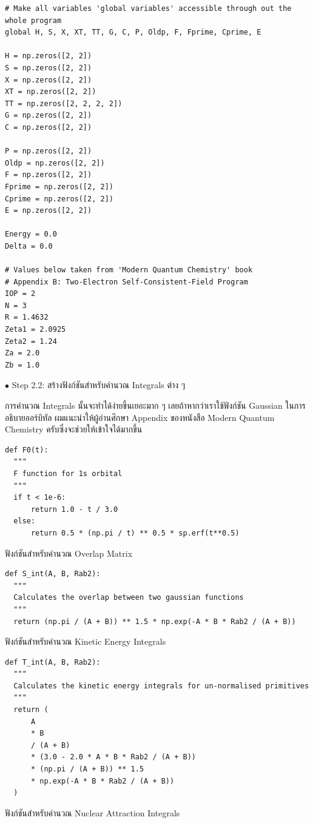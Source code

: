 \begin{lstlisting}[style=MyPython]
# Make all variables 'global variables' accessible through out the whole program
global H, S, X, XT, TT, G, C, P, Oldp, F, Fprime, Cprime, E

H = np.zeros([2, 2])
S = np.zeros([2, 2])
X = np.zeros([2, 2])
XT = np.zeros([2, 2])
TT = np.zeros([2, 2, 2, 2])
G = np.zeros([2, 2])
C = np.zeros([2, 2])

P = np.zeros([2, 2])
Oldp = np.zeros([2, 2])
F = np.zeros([2, 2])
Fprime = np.zeros([2, 2])
Cprime = np.zeros([2, 2])
E = np.zeros([2, 2])

Energy = 0.0
Delta = 0.0

# Values below taken from 'Modern Quantum Chemistry' book
# Appendix B: Two-Electron Self-Consistent-Field Program
IOP = 2
N = 3
R = 1.4632
Zeta1 = 2.0925
Zeta2 = 1.24
Za = 2.0
Zb = 1.0
\end{lstlisting}

\vspace{5pt}

\noindent $\bullet$ Step 2.2: สร้างฟังก์ชันสำหรับคำนวณ Integrals ต่าง ๆ

การคำนวณ Integrals นั้นจะทำได้ง่ายขึ้นเยอะมาก ๆ เลยถ้าหากว่าเราใช้ฟังก์ชัน Gaussian ในการอธิบายออร์บิทัล ผมแนะนำให้ผู้อ่านศึกษา Appendix ของหนังสือ Modern Quantum Chemistry ครับซึ่งจะช่วยให้เข้าใจได้มากขึ้น

\vspace{5pt}

\begin{lstlisting}[style=MyPython]
def F0(t):
  """
  F function for 1s orbital
  """
  if t < 1e-6:
      return 1.0 - t / 3.0
  else:
      return 0.5 * (np.pi / t) ** 0.5 * sp.erf(t**0.5)
\end{lstlisting}
%
\vspace{5pt}
%
ฟังก์ชันสำหรับคำนวณ Overlap Matrix

\vspace{5pt}

\begin{lstlisting}[style=MyPython]
def S_int(A, B, Rab2):
  """
  Calculates the overlap between two gaussian functions
  """
  return (np.pi / (A + B)) ** 1.5 * np.exp(-A * B * Rab2 / (A + B))
\end{lstlisting}
%
\vspace{5pt}
%
ฟังก์ชันสำหรับคำนวณ Kinetic Energy Integrals

\vspace{5pt}

\begin{lstlisting}[style=MyPython]
def T_int(A, B, Rab2):
  """
  Calculates the kinetic energy integrals for un-normalised primitives
  """
  return (
      A
      * B
      / (A + B)
      * (3.0 - 2.0 * A * B * Rab2 / (A + B))
      * (np.pi / (A + B)) ** 1.5
      * np.exp(-A * B * Rab2 / (A + B))
  )
\end{lstlisting}
%
\vspace{5pt}
%
ฟังก์ชันสำหรับคำนวณ Nuclear Attraction Integrals

